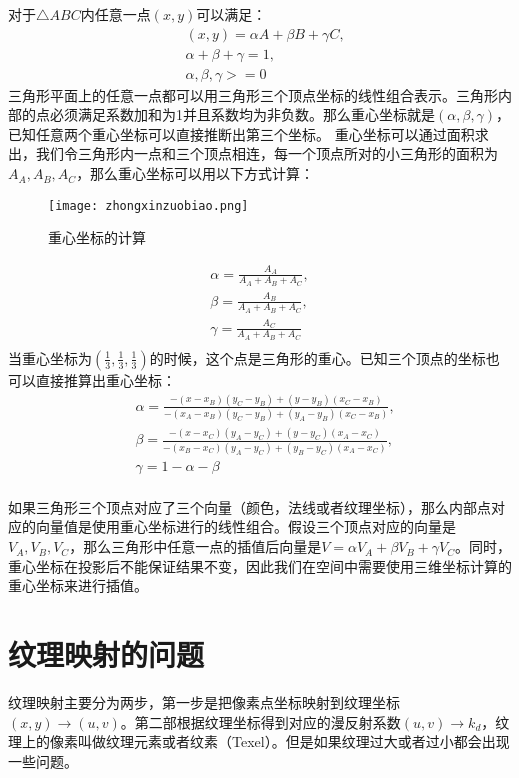 \documentclass[openany]{progbookcn}
\begin{document}
对于$\triangle ABC$内任意一点$(x,y)$可以满足：
\begin{equation}
	\begin{split}
		&(x,y) = \alpha A + \beta B + \gamma C, \\
		&\alpha + \beta + \gamma = 1,\\
		& \alpha, \beta, \gamma >= 0
	\end{split}
\end{equation}
三角形平面上的任意一点都可以用三角形三个顶点坐标的线性组合表示。三角形内部的点必须满足系数加和为1并且系数均为非负数。那么重心坐标就是$(\alpha,\beta,\gamma)$，已知任意两个重心坐标可以直接推断出第三个坐标。
重心坐标可以通过面积求出，我们令三角形内一点和三个顶点相连，每一个顶点所对的小三角形的面积为$A_A,A_B,A_C$，那么重心坐标可以用以下方式计算：
\begin{figure}[H]
	\centering
	\texttt{[image: zhongxinzuobiao.png]}
	\caption{重心坐标的计算}
	\label{fig:zongxinzuobiao}
\end{figure}
\begin{equation}
	\begin{split}
		\alpha = \frac{A_A}{A_A+A_B+A_C},\\
		\beta = \frac{A_B}{A_A+A_B+A_C},\\
		\gamma = \frac{A_C}{A_A+A_B+A_C}\\
	\end{split}
\end{equation}
当重心坐标为$(\frac{1}{3},\frac{1}{3},\frac{1}{3})$的时候，这个点是三角形的重心。已知三个顶点的坐标也可以直接推算出重心坐标：
\begin{equation}
	\begin{split}
		&\alpha = \frac{-(x-x_B)(y_C-y_B) + (y-y_B)(x_C-x_B)}{-(x_A-x_B)(y_C-y_B) + (y_A-y_B)(x_C-x_B)},\\
		&\beta =  \frac{-(x-x_C)(y_A-y_C) + (y-y_C)(x_A-x_C)}{-(x_B-x_C)(y_A-y_C) + (y_B-y_C)(x_A-x_C)},\\
		&\gamma = 1-\alpha-\beta\\
	\end{split}
\end{equation}

如果三角形三个顶点对应了三个向量（颜色，法线或者纹理坐标），那么内部点对应的向量值是使用重心坐标进行的线性组合。假设三个顶点对应的向量是$V_A,V_B,V_C$，那么三角形中任意一点的插值后向量是$V=\alpha V_A +\beta V_B+\gamma V_C$。同时，重心坐标在投影后不能保证结果不变，因此我们在空间中需要使用三维坐标计算的重心坐标来进行插值。

\section{纹理映射的问题}
纹理映射主要分为两步，第一步是把像素点坐标映射到纹理坐标$(x,y)\rightarrow (u,v)$。第二部根据纹理坐标得到对应的漫反射系数$(u,v)\rightarrow k_d$，纹理上的像素叫做纹理元素或者纹素（Texel）。但是如果纹理过大或者过小都会出现一些问题。
\end{document}
